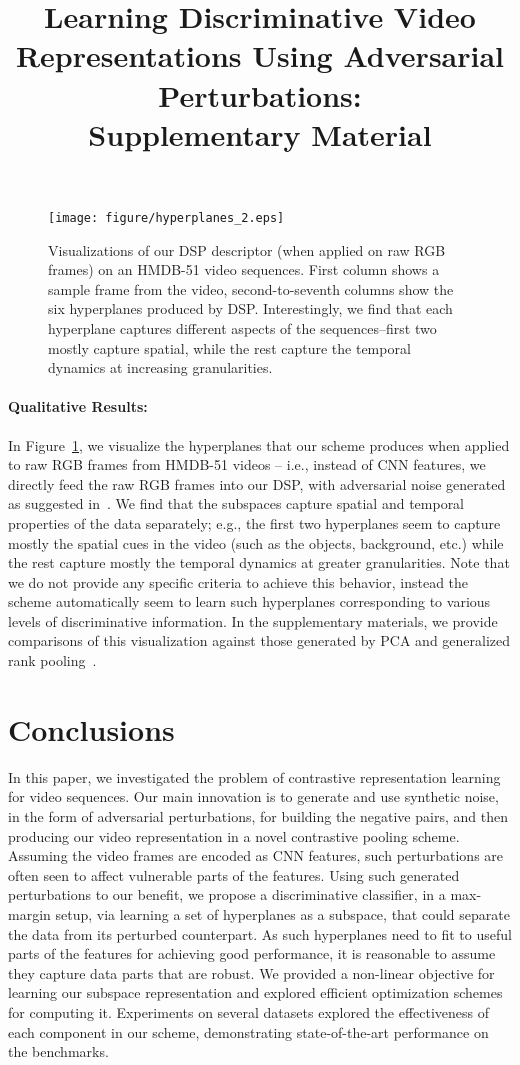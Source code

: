 \documentclass[runningheads]{llncs}
\newcommand{\para}[1]{\noindent\paragraph*{\textbf{#1}}}
\begin{document}
\begin{figure}[!h]	
	\begin{center}
        \texttt{[image: figure/hyperplanes\_2.eps]}
	\end{center}
	\caption{Visualizations of our DSP descriptor (when applied on raw RGB frames) on an HMDB-51 video sequences. First column shows a sample frame from the video, second-to-seventh columns show the six hyperplanes produced by DSP. Interestingly, we find that each hyperplane captures different aspects of the sequences--first two mostly capture spatial, while the rest capture the temporal dynamics at increasing granularities.}	
    \label{fig:4}
\end{figure}
\para{Qualitative Results:} In Figure~\ref{fig:4}, we visualize the hyperplanes that our scheme produces when applied to raw RGB frames from HMDB-51 videos -- i.e., instead of CNN features, we directly feed the raw RGB frames into our DSP, with adversarial noise generated as suggested in~\cite{moosavi2017universal}. We find that the subspaces capture spatial and temporal properties of the data separately; e.g., the first two hyperplanes seem to capture mostly the spatial cues in the video (such as the objects, background, etc.) while the rest capture mostly the temporal dynamics at greater granularities. Note that we do not provide any specific criteria to achieve this behavior, instead the scheme automatically seem to learn such hyperplanes corresponding to various levels of discriminative information. In the supplementary materials, we provide comparisons of this visualization against those generated by PCA and generalized rank pooling~\cite{grp}. 

 \section{Conclusions}
\label{sec:conclude}
In this paper, we investigated the problem of contrastive representation learning for video sequences. Our main innovation is to generate and use synthetic noise, in the form of adversarial perturbations, for building the negative pairs, and then producing our video representation in a novel contrastive pooling scheme. Assuming the video frames are encoded as CNN features, such perturbations are often seen to affect vulnerable parts of the features. Using such generated perturbations to our benefit, we propose a discriminative classifier, in a max-margin setup, via learning a set of hyperplanes as a subspace, that could separate the data from its perturbed counterpart. As such hyperplanes need to fit to useful parts of the features for achieving good performance, it is reasonable to assume they capture data parts that are robust. We provided a non-linear objective for learning our subspace representation and explored efficient optimization schemes for computing it. Experiments on several datasets explored the effectiveness of each component in our scheme, demonstrating state-of-the-art performance on the benchmarks. 

\newpage
\title{Learning Discriminative Video Representations Using Adversarial Perturbations:\\Supplementary Material} 
\end{document}
